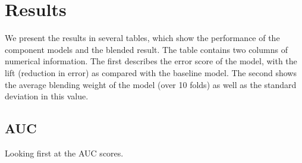\documentclass{article}
\begin{document}
\section{Results}


We present the results in several tables, which show the performance of the component models and the blended result.  The table contains two columns of numerical information.  The first describes the error score of the model, with the lift (reduction in error) as compared with the baseline model.  The second shows the average blending weight of the model (over 10 folds) as well as the standard deviation in this value.

\subsection{AUC}

Looking first at the AUC scores.

\end{document}
